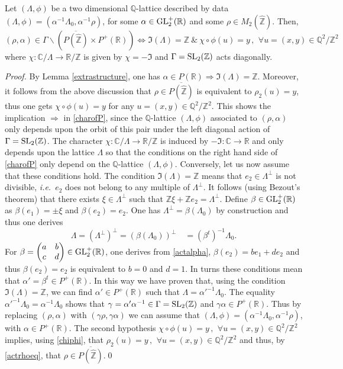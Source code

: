 \documentclass[graybox, envcountsect%
]{svmult}
\def\GL{{\rm GL}}
\def\SL{{\rm SL}}
\def\C{{\mathbb C}}
\def\Q{{\mathbb Q}}
\def\R{{\mathbb R}}
\def\Z{{\mathbb Z}}
\def\qqq{\,,\,~\forall}
\newcommand{\ie}{{\it i.e.\/}\ }
\begin{document}
\begin{lemma}\label{extrastructure1} Let $(\Lambda,\phi)$ be a two dimensional $\Q$-lattice described by data $(\Lambda,\phi)=(\alpha^{-1}\Lambda_0, \alpha^{-1}\rho)$, 
for some $\alpha\in\GL_2^+(\R)$ and some $\rho\in M_2(\hat\Z)$. Then, 
\begin{equation}\label{charofP}
(\rho,\alpha)\in \Gamma\backslash\left(
\overline{P(\hat\Z)}\times P^+(\R)\right)\iff\Im(\Lambda)=\Z \ \&  \ \chi\circ \phi(u)=y \qqq u=(x,y)\in \Q^2/\Z^2
\end{equation}
where $\chi:\C/\Lambda\to \R/\Z$ is given by $\chi=-\Im$ and  $\Gamma= \SL_2(\Z)$ acts diagonally.
\end{lemma}
\begin{proof} By Lemma \ref{extrastructure}, one has $\alpha \in P(\R)\Rightarrow \Im(\Lambda)=\Z $. Moreover, it follows from the above discussion that $\rho \in \overline{P(\hat\Z)}$ is equivalent to $\rho_2(u)=y$, thus one gets $\chi\circ \phi(u)=y$ for any $ u=(x,y)\in \Q^2/\Z^2$. This shows the implication $\Rightarrow$ in \eqref{charofP}, since the $\Q$-lattice  $(\Lambda,\phi)$ associated to $(\rho,\alpha)$ only depends upon the orbit of this pair under the left diagonal action of $\Gamma= \SL_2(\Z)$. The character $\chi:\C/\Lambda\to \R/\Z$ is induced by $-\Im:\C\to \R$ and only depends upon the lattice $\Lambda$ so that the conditions on the right hand side of \eqref{charofP} only depend on the $\Q$-lattice  $(\Lambda,\phi)$. \newline
Conversely, let us now assume that these conditions hold. The condition $\Im(\Lambda)=\Z$ means that $e_2\in \Lambda^\perp$ is not divisible, \ie $e_2$ does not belong to any multiple of $\Lambda^\perp$. It follows (using Bezout's theorem) that there exists $\xi\in \Lambda^\perp$ such that $\Z \xi+ \Z e_2=\Lambda^\perp$. Define $\beta\in\GL_2^+(\R)$ as $\beta(e_1)=\pm\xi$ and $\beta(e_2)=e_2$. One has $\Lambda^\perp=\beta(\Lambda_0)$ by construction and thus one derives
$$
\Lambda=(\Lambda^\perp)^\perp=(\beta(\Lambda_0))^\perp
\quad =(\beta^t)^{-1}\Lambda_0.
$$
For $\beta=\begin{pmatrix} a &b \\
c &d \end{pmatrix} \in \GL_2^+(\R)$, one derives from \eqref{actalpha},  $\beta(e_2)=b e_1+ d e_2$ and thus $\beta(e_2)=e_2$ is equivalent to $b=0$ and $d=1$. In turns these conditions mean that $\alpha'=\beta^t\in P^+(\R)$. In this way we have proven that, using the condition $\Im(\Lambda)=\Z$, we can find $\alpha'\in P^+(\R)$ such that $\Lambda=\alpha'^{-1}\Lambda_0$. The equality $\alpha'^{-1}\Lambda_0=\alpha^{-1}\Lambda_0$ shows that  $\gamma=\alpha'\alpha^{-1}\in \Gamma=\SL_2(\Z)$ and $\gamma\alpha\in P^+(\R)$. Thus by replacing   $(\rho,\alpha)$ with $(\gamma\rho,\gamma\alpha)$ we can assume that $(\Lambda,\phi)=(\alpha^{-1}\Lambda_0, \alpha^{-1}\rho)$, with $\alpha\in P^+(\R)$. The second hypothesis $\chi\circ \phi(u)=y \qqq u=(x,y)\in \Q^2/\Z^2$ implies,  using \eqref{chiphi}, that $\rho_2(u)=y \qqq u=(x,y)\in \Q^2/\Z^2$ and thus, by \eqref{actrhoeq}, that $\rho \in \overline{P(\hat\Z)}$.\qed\end{proof}
\end{document}
